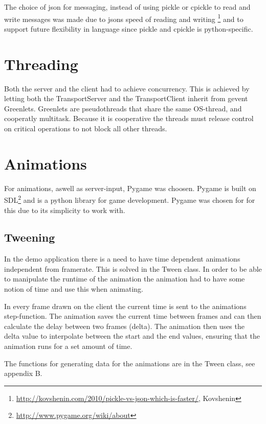 The choice of json for messaging, instead of using pickle or cpickle to read and write messages was made due to jsons speed of reading and writing \footnote{\url{http://kovshenin.com/2010/pickle-vs-json-which-is-faster/}, Kovshenin} and to support future flexibility in language since pickle and cpickle is python-specific. 



\section{Threading}
\label{sec:threading}

Both the server and the client had to achieve concurrency. This is achieved by letting both the TransportServer and the TransportClient inherit from gevent Greenlets. 
Greenlets are pseudothreads that share the same OS-thread, and cooperatly multitask. Because it is cooperative the threads must release control on critical operations to not block all other threads. 

\section{Animations}

For animations, aswell as server-input, Pygame was choosen. Pygame is built on SDL\footnote{\url{http://www.pygame.org/wiki/about}} and is a python library for game development. Pygame was chosen for for this due to its simplicity to work with.

\subsection{Tweening}

In the demo application there is a need to have time dependent animations independent from framerate. This is solved in the Tween class. 
In order to be able to manipulate the runtime of the animation the animation had to have some notion of time and use this when animating. 

In every frame drawn on the client the current time is sent to the animations step-function. The animation saves the current time between frames and can then calculate the delay between two frames (delta). The animation then uses the delta value to interpolate between the start and the end values, ensuring that the animation runs for a set amount of time. 

The functions for generating data for the animations are in the Tween class, see appendix B.  




